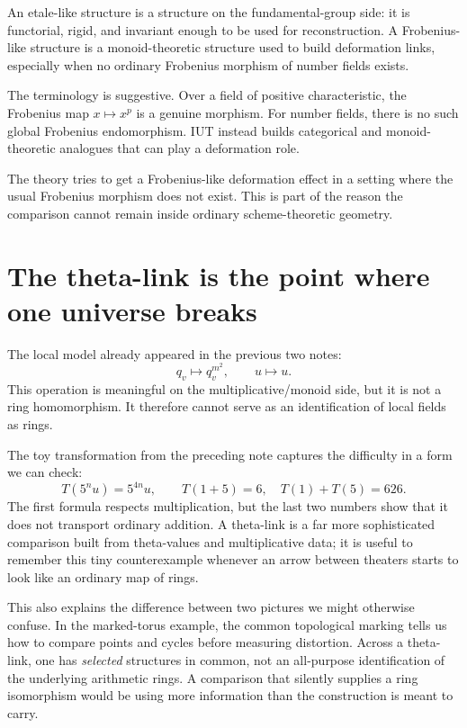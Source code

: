 \begin{definition}
An etale-like structure is a structure on the fundamental-group side: it is functorial, rigid, and invariant enough to be used for reconstruction.  A Frobenius-like structure is a monoid-theoretic structure used to build deformation links, especially when no ordinary Frobenius morphism of number fields exists.
\end{definition}

The terminology is suggestive.  Over a field of positive characteristic, the Frobenius map \(x\mapsto x^p\) is a genuine morphism.  For number fields, there is no such global Frobenius endomorphism.  IUT instead builds categorical and monoid-theoretic analogues that can play a deformation role.

\begin{remark}
The theory tries to get a Frobenius-like deformation effect in a setting where the usual Frobenius morphism does not exist.  This is part of the reason the comparison cannot remain inside ordinary scheme-theoretic geometry.
\end{remark}

\section{The theta-link is the point where one universe breaks}

The local model already appeared in the previous two notes:
\[
  q_v\longmapsto q_v^{m^2},
  \qquad
  u\longmapsto u.
\]
This operation is meaningful on the multiplicative/monoid side, but it is not a ring homomorphism.  It therefore cannot serve as an identification of local fields as rings.

The toy transformation from the preceding note captures the difficulty in a form we can check:
\[
 T(5^nu)=5^{4n}u,\qquad
 T(1+5)=6,\quad T(1)+T(5)=626.
\]
The first formula respects multiplication, but the last two numbers show that it does not transport ordinary addition. A theta-link is a far more sophisticated comparison built from theta-values and multiplicative data; it is useful to remember this tiny counterexample whenever an arrow between theaters starts to look like an ordinary map of rings.

This also explains the difference between two pictures we might otherwise confuse. In the marked-torus example, the common topological marking tells us how to compare points and cycles before measuring distortion. Across a theta-link, one has \emph{selected} structures in common, not an all-purpose identification of the underlying arithmetic rings. A comparison that silently supplies a ring isomorphism would be using more information than the construction is meant to carry.

